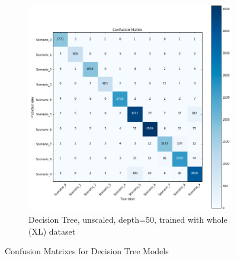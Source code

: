 \begin{figure}[!htb]
\begin{subfigure}[htb]{0.49\textwidth}
        \includegraphics[width=\linewidth]{figures/dtc_unscaled_XL_50}
        \caption{Decision Tree, unscaled, depth=50, trained with whole (XL) dataset}
        \label{fig:knn_4}
    \end{subfigure}
    \caption{Confusion Matrixes for Decision Tree Models}
    \label{fig:confusiondtc}
\end{figure}
